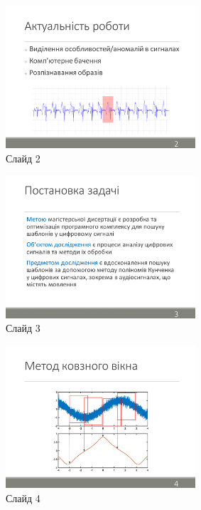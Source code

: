 \documentclass[pdftex]{thesis_utf8}
\begin{document}
\begin{figure}[h]
    \centering
    \includegraphics[width=0.63\textwidth]{slides/slide02.png}
    \caption{Слайд 2}
\end{figure}

\clearpage
\begin{figure}[h]
    \centering
    \includegraphics[width=0.63\textwidth]{slides/slide03.png}
    \caption{Слайд 3}
\end{figure}

\begin{figure}[h]
    \centering
    \includegraphics[width=0.63\textwidth]{slides/slide04.png}
    \caption{Слайд 4}
\end{figure}
\end{document}
